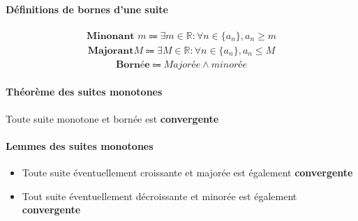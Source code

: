 \documentclass{report}
\begin{document}
\begin{multicols*}{3}
    \paragraph{Définitions de bornes d'une suite}
       \begin{align*}
           \textbf{Minonant } m \Coloneqq 
           \exists m \in \mathbb{R} : \forall n \in \{ a_n \}, 
           a_n \geq m
       \end{align*}
       \begin{align*}
           \textbf{Majorant} M \Coloneqq 
           \exists M \in \mathbb{R} : \forall n \in \{ a_n \}, 
           a_n \leq M
       \end{align*}
       \begin{align*}
           \textbf{Bornée} \Coloneqq 
            \textit{Majorée} \land \textit{minorée}
       \end{align*}
       


    \paragraph{Théorème des suites monotones}
        Toute suite monotone et bornée est \textbf{convergente}  


    \paragraph{Lemmes des suites monotones}
        \begin{itemize}
            \item Toute suite éventuellement croissante et majorée 
        est également \textbf{convergente}  
            \item Tout suite éventuellement décroissante et 
            minorée est également \textbf{convergente}  
        \end{itemize}
    



\end{multicols*}
\end{document}

